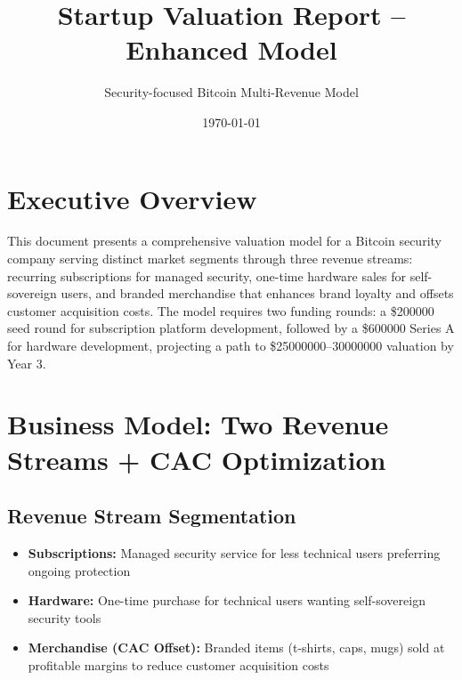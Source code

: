 \documentclass[11pt]{article}
\newcommand{\seedAmount}{200000}
\newcommand{\seriesAAmount}{600000}
\newcommand{\valuationRangeLow}{25000000}
\newcommand{\valuationRangeHigh}{30000000}
\begin{document}
\title{Startup Valuation Report -- Enhanced Model}
\author{Security-focused Bitcoin Multi-Revenue Model}
\date{\today}
\maketitle

\section*{Executive Overview}
This document presents a comprehensive valuation model for a Bitcoin security company serving distinct market segments through three revenue streams: recurring subscriptions for managed security, one-time hardware sales for self-sovereign users, and branded merchandise that enhances brand loyalty and offsets customer acquisition costs. The model requires two funding rounds: a \$\seedAmount{} seed round for subscription platform development, followed by a \$\seriesAAmount{} Series A for hardware development, projecting a path to \$\num{\valuationRangeLow}--\num{\valuationRangeHigh} valuation by Year 3.

\section{Business Model: Two Revenue Streams + CAC Optimization}

\subsection{Revenue Stream Segmentation}
\begin{itemize}
  \item \textbf{Subscriptions:} Managed security service for less technical users preferring ongoing protection
  \item \textbf{Hardware:} One-time purchase for technical users wanting self-sovereign security tools
  \item \textbf{Merchandise (CAC Offset):} Branded items (t-shirts, caps, mugs) sold at profitable margins to reduce customer acquisition costs
\end{itemize}
\end{document}

